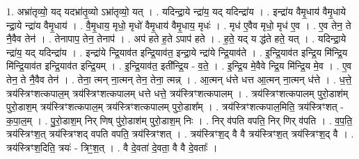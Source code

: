 \documentclass[17pt]{extarticle}
\begin{document}
1. अभ्रा॑तृव्यो॒ यद् यदभ्रा॑तृ॒व्यो ऽभ्रा॑तृव्यो॒ यत् । . यदिन्द्रा॒ये न्द्रा॑य॒ यद् यदिन्द्रा॑य । . इन्द्रा॑य वैमृ॒धाय॑ वैमृ॒धाये न्द्रा॒ये न्द्रा॑य वैमृ॒धाय॑ । . वै॒मृ॒धाय॒ मृधो॒ मृधो॑ वैमृ॒धाय॑ वैमृ॒धाय॒ मृधः॑ । . मृध॑ ए॒वैव मृधो॒ मृध॑ ए॒व । . ए॒व तेन॒ ते नै॒वैव तेन॑ । . तेनापाप॒ तेन॒ तेनाप॑ । . अप॑ हते ह॒ते ऽपाप॑ हते । . ह॒ते॒ यद् य द्ध॑ते हते॒ यत् । . यदिन्द्रा॒ये न्द्रा॑य॒ यद् यदिन्द्रा॑य । . इन्द्रा॑ये न्द्रि॒याव॑त इन्द्रि॒याव॑त॒ इन्द्रा॒ये न्द्रा॑ये न्द्रि॒याव॑ते । . इ॒न्द्रि॒याव॑त इन्द्रि॒य मि॑न्द्रि॒य मि॑न्द्रि॒याव॑त इन्द्रि॒याव॑त इन्द्रि॒यम् । . इ॒न्द्रि॒याव॑त॒ इती᳚न्द्रि॒य - व॒ते॒ । . इ॒न्द्रि॒य मे॒वैवे न्द्रि॒य मि॑न्द्रि॒य मे॒व । . ए॒व तेन॒ ते नै॒वैव तेन॑ । . तेना॒ त्मन् ना॒त्मन् तेन॒ तेना॒ त्मन्न् । . आ॒त्मन् ध॑त्ते धत्त आ॒त्मन् ना॒त्मन् ध॑त्ते । . ध॒त्ते॒ त्रय॑स्त्रिꣳशत्कपाल॒म् त्रय॑स्त्रिꣳशत्कपालम् धत्ते धत्ते॒ त्रय॑स्त्रिꣳशत्कपालम् । . त्रय॑स्त्रिꣳशत्कपालम् पुरो॒डाश॑म् पुरो॒डाश॒म् त्रय॑स्त्रिꣳशत्कपाल॒म् त्रय॑स्त्रिꣳशत्कपालम् पुरो॒डाश᳚म् । . त्रय॑स्त्रिꣳशत्कपाल॒मिति॒ त्रय॑स्त्रिꣳशत् - क॒पा॒ल॒म् । . पु॒रो॒डाश॒म् निर् णिष् पु॑रो॒डाश॑म् पुरो॒डाश॒म् निः । . निर् व॑पति वपति॒ निर् णिर् व॑पति । . व॒प॒ति॒ त्रय॑स्त्रिꣳश॒त् त्रय॑स्त्रिꣳशद् वपति वपति॒ त्रय॑स्त्रिꣳशत् । . त्रय॑स्त्रिꣳश॒द् वै वै त्रय॑स्त्रिꣳश॒त् त्रय॑स्त्रिꣳश॒द् वै । . त्रय॑स्त्रिꣳश॒दिति॒ त्रयः॑ - त्रिꣳ॒॒श॒त् । . वै दे॒वता॑ दे॒वता॒ वै वै दे॒वताः᳚ । \newline
\end{document}
